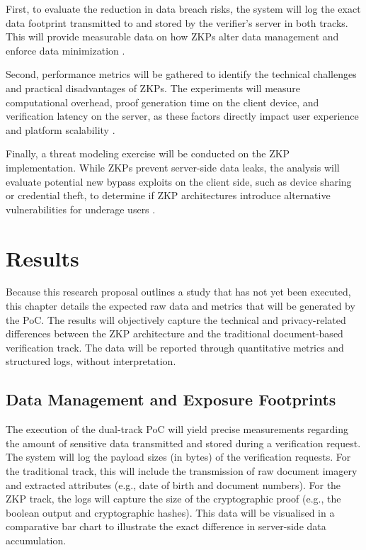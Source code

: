 \documentclass [english]{hogent-article}
\begin{document}
    
    
    First, to evaluate the reduction in data breach risks, the system will log the exact data footprint transmitted to and stored by the verifier's server in both tracks. This will provide measurable data on how ZKPs alter data management and enforce data minimization \autocite{Wodo2025}. 
    
    
    
    Second, performance metrics will be gathered to identify the technical challenges and practical disadvantages of ZKPs. The experiments will measure computational overhead, proof generation time on the client device, and verification latency on the server, as these factors directly impact user experience and platform scalability \autocite{EUCommission2025, EFF2025ZKP}. 
    
    
    
    Finally, a threat modeling exercise will be conducted on the ZKP implementation. While ZKPs prevent server-side data leaks, the analysis will evaluate potential new bypass exploits on the client side, such as device sharing or credential theft, to determine if ZKP architectures introduce alternative vulnerabilities for underage users \autocite{Lueks2026, EFF2025ZKP}.
    
    
    
    \section{Results}%
    
    \label{sec:results}
    
    
    
    Because this research proposal outlines a study that has not yet been executed, this chapter details the expected raw data and metrics that will be generated by the PoC. The results will objectively capture the technical and privacy-related differences between the ZKP architecture and the traditional document-based verification track. The data will be reported through quantitative metrics and structured logs, without interpretation.
    
    
    
    \subsection{Data Management and Exposure Footprints}
    
    The execution of the dual-track PoC will yield precise measurements regarding the amount of sensitive data transmitted and stored during a verification request. The system will log the payload sizes (in bytes) of the verification requests. For the traditional track, this will include the transmission of raw document imagery and extracted attributes (e.g., date of birth and document numbers). For the ZKP track, the logs will capture the size of the cryptographic proof (e.g., the boolean output and cryptographic hashes). This data will be visualised in a comparative bar chart to illustrate the exact difference in server-side data accumulation.
    
\end{document}
